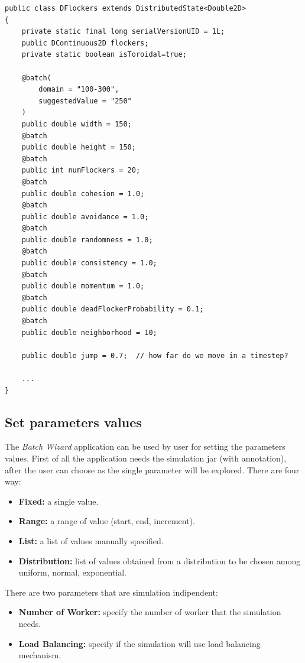 \documentclass{article}
\begin{document}
\begin{lstlisting}
public class DFlockers extends DistributedState<Double2D>
{
	private static final long serialVersionUID = 1L;
	public DContinuous2D flockers;
    private static boolean isToroidal=true;
     
    @batch(
    	domain = "100-300",
    	suggestedValue = "250"
    )
    public double width = 150;
    @batch
    public double height = 150;
    @batch
    public int numFlockers = 20;
    @batch
    public double cohesion = 1.0;
    @batch
    public double avoidance = 1.0;
    @batch
    public double randomness = 1.0;
    @batch
    public double consistency = 1.0;
    @batch
    public double momentum = 1.0;
    @batch
    public double deadFlockerProbability = 0.1;
    @batch
    public double neighborhood = 10;
    
    public double jump = 0.7;  // how far do we move in a timestep?
    
    ...
}
\end{lstlisting}

\subsection{Set parameters values}
The \textit{Batch Wizard} application can be used by user for setting the parameters values. 
First of all the application needs the simulation jar (with annotation), after the user can 
choose as the single parameter will be explored. There are four way:
\begin{itemize}
  \item \textbf{Fixed:} a single value.
  \item \textbf{Range:} a range of value (start, end, increment).
  \item \textbf{List:} a list of values manually specified.
  \item \textbf{Distribution:} list of values obtained from a distribution to be chosen among uniform, normal, exponential.
\end{itemize}

There are two parameters that are simulation indipendent:
\begin{itemize}
  \item \textbf{Number of Worker:} specify the number of worker that the simulation needs.
  \item \textbf{Load Balancing: } specify if the simulation will use load balancing mechanism.
\end{itemize}
\end{document}
